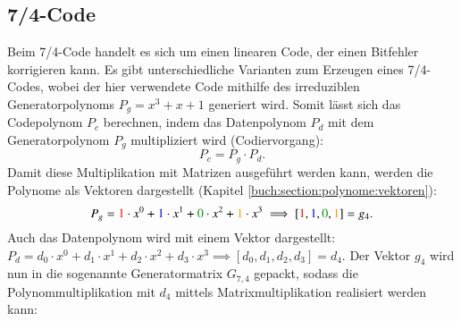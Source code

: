\subsection{7/4-Code
\label{mceliece:subsection:seven_four}}
Beim 7/4-Code handelt es sich um einen linearen Code,
der einen Bitfehler korrigieren kann.
%
%
%
Es gibt unterschiedliche Varianten zum Erzeugen eines 7/4-Codes,
wobei der hier verwendete Code mithilfe des irreduziblen Generatorpolynoms $P_g = x^3 +x + 1$ generiert wird.
%
Somit lässt sich das Codepolynom $P_c$ berechnen, indem das Datenpolynom $P_d$ mit dem Generatorpolynom $P_g$ multipliziert wird (Codiervorgang):
\[
    P_c=P_g \cdot P_d.
\]
Damit diese Multiplikation mit Matrizen ausgeführt werden kann, werden die Polynome als Vektoren dargestellt (Kapitel \ref{buch:section:polynome:vektoren}):
\[
    P_g = \textcolor{red}{1}\cdot x^0 + \textcolor{blue}{1}\cdot x^1 + \textcolor{darkgreen}{0}\cdot x^2 + \textcolor{orange}{1}\cdot x^3 \implies
    [\textcolor{red}{1}, \textcolor{blue}{1} ,\textcolor{darkgreen}{0}, \textcolor{orange}{1}] = g_4.
\]
Auch das Datenpolynom wird mit einem Vektor dargestellt: $P_d = d_0 \cdot x^0 + d_1 \cdot x^1 + d_2 \cdot x^2 + d_3 \cdot x^3 \implies [d_0, d_1, d_2, d_3] = d_4$.
Der Vektor $g_4$ wird nun in die sogenannte Generatormatrix $G_{7,4}$ gepackt,
sodass die Polynommultiplikation mit $d_4$ mittels Matrixmultiplikation realisiert werden kann:

